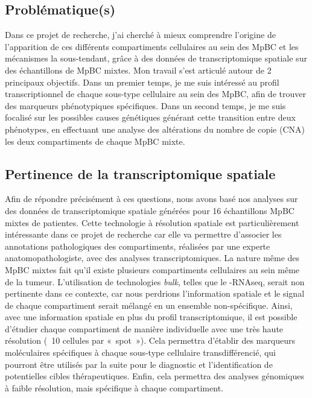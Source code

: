 \documentclass[11pt]{article}
\begin{document}
\subsection{Problématique(s)}

Dans ce projet de recherche, j’ai cherché à mieux comprendre l’origine de l’apparition de ces différents compartiments cellulaires au sein des MpBC et les mécanismes la sous-tendant, grâce à des données de transcriptomique spatiale sur des échantillons de MpBC mixtes. Mon travail s’est articulé autour de 2 principaux objectifs. Dans un premier temps, je me suis intéressé au profil transcriptionnel de chaque sous-type cellulaire au sein des MpBC, afin de trouver des marqueurs phénotypiques spécifiques. Dans un second temps, je me suis focalisé sur les possibles causes génétiques générant cette transition entre deux phénotypes, en effectuant une analyse des altérations du nombre de copie (CNA) les deux compartiments de chaque MpBC mixte.

\subsection{Pertinence de la transcriptomique spatiale}

Afin de répondre précisément à ces questions, nous avons basé nos analyses sur des données de transcriptomique spatiale générées pour 16 échantillons MpBC mixtes de patientes. Cette technologie à résolution spatiale est particulièrement intéressante dans ce projet de recherche car elle va permettre d’associer les annotations pathologiques des compartiments, réalisées par une experte anatomopathologiste, avec des analyses transcriptomiques. La nature même des MpBC mixtes fait qu’il existe plusieurs compartiments cellulaires au sein même de la tumeur. L’utilisation de technologies \textit{bulk}, telles que le -RNAseq, serait non pertinente dans ce contexte, car nous perdrions l’information spatiale et le signal de chaque compartiment serait mélangé en un ensemble non-spécifique. Ainsi, avec une information spatiale en plus du profil transcriptomique, il est possible d’étudier chaque compartiment de manière individuelle avec une très haute résolution (~10 cellules par « spot »). Cela permettra d’établir des marqueurs moléculaires spécifiques à chaque sous-type cellulaire transdifférencié, qui pourront être utilisés par la suite pour le diagnostic et l’identification de potentielles cibles thérapeutiques. Enfin, cela permettra des analyses génomiques à faible résolution, mais spécifique à chaque compartiment.
\end{document}
